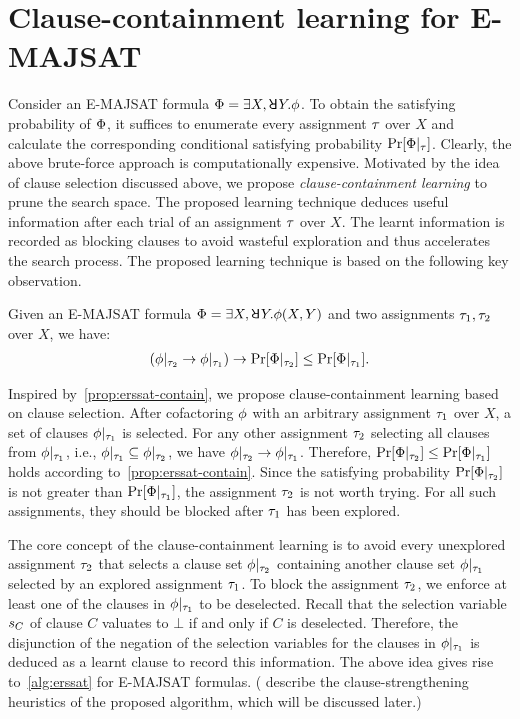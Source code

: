 \section{Clause-containment learning for E-MAJSAT}
\label{sect:erssat-technique}

Consider an E-MAJSAT formula $\Qf = \exists X,\random{} Y.\pf$.
To obtain the satisfying probability of $\Phi$,
it suffices to enumerate every assignment $\tau$ over $X$ and calculate the corresponding conditional satisfying probability $\Pr[\Phi|_{\tau}]$.
Clearly, the above brute-force approach is computationally expensive.
Motivated by the idea of clause selection discussed above,
we propose \textit{clause-containment learning} to prune the search space.
The proposed learning technique deduces useful information after each trial of an assignment $\tau$ over $X$.
The learnt information is recorded as blocking clauses to avoid wasteful exploration and thus accelerates the search process.
The proposed learning technique is based on the following key observation.

\begin{proposition}
    \label{prop:erssat-contain}
    Given an E-MAJSAT formula $\Qf=\exists X,\random{} Y.\pf(X,Y)$ and two assignments $\tau_1,\tau_2$ over $X$,
    we have:
    \begin{align*}
        (\phi|_{\tau_2}\rightarrow\phi|_{\tau_1})\rightarrow\Pr[\Phi|_{\tau_2}]\leq\Pr[\Phi|_{\tau_1}].
    \end{align*}
\end{proposition}

Inspired by~\cref{prop:erssat-contain},
we propose clause-containment learning based on clause selection.
After cofactoring $\phi$ with an arbitrary assignment $\tau_1$ over $X$,
a set of clauses $\phi|_{\tau_1}$ is selected.
For any other assignment $\tau_2$ selecting all clauses from $\phi|_{\tau_1}$,
i.e., $\phi|_{\tau_1}\subseteq\phi|_{\tau_2}$,
we have $\phi|_{\tau_2}\rightarrow\phi|_{\tau_1}$.
Therefore, $\Pr[\Phi|_{\tau_2}]\leq\Pr[\Phi|_{\tau_1}]$ holds according to~\cref{prop:erssat-contain}.
Since the satisfying probability $\Pr[\Phi|_{\tau_2}]$ is not greater than $\Pr[\Phi|_{\tau_1}]$,
the assignment $\tau_2$ is not worth trying.
For all such assignments,
they should be blocked after $\tau_1$ has been explored.

The core concept of the clause-containment learning is to avoid every unexplored assignment $\tau_2$ that selects a clause set $\phi|_{\tau_2}$ containing another clause set $\phi|_{\tau_1}$ selected by an explored assignment $\tau_1$.
To block the assignment $\tau_2$,
we enforce at least one of the clauses in $\phi|_{\tau_1}$ to be deselected.
Recall that the selection variable $s_{C}$ of clause $C$ valuates to $\bot$ if and only if $C$ is deselected.
Therefore, the disjunction of the negation of the selection variables for the clauses in $\phi|_{\tau_1}$ is deduced as a learnt clause to record this information.
The above idea gives rise to~\cref{alg:erssat} for E-MAJSAT formulas.
( describe the clause-strengthening heuristics of the proposed algorithm, which will be discussed later.)

